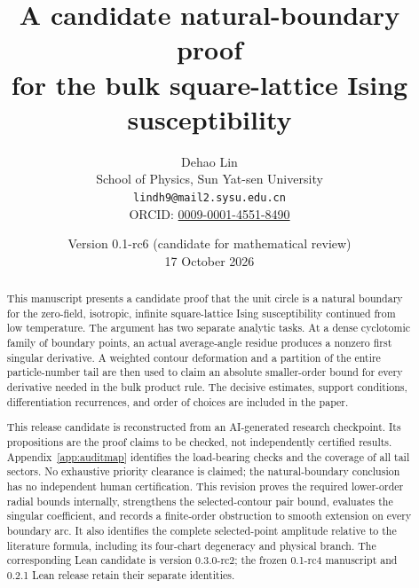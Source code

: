\documentclass[11pt]{article}
\title{A candidate natural-boundary proof\\
for the bulk square-lattice Ising susceptibility}
\author{Dehao Lin\\
\small School of Physics, Sun Yat-sen University\\
\small\texttt{lindh9@mail2.sysu.edu.cn}\\
\small ORCID: \href{https://orcid.org/0009-0001-4551-8490}{0009-0001-4551-8490}}
\date{Version 0.1-rc6 (candidate for mathematical review)\\17 October 2026}
\numberwithin{equation}{section}
\theoremstyle{definition}
\begin{document}
\maketitle

\begin{abstract}
This manuscript presents a candidate proof that the unit circle is a
natural boundary for the zero-field, isotropic, infinite square-lattice
Ising susceptibility continued from low temperature. The argument has
two separate analytic tasks. At a dense cyclotomic family of boundary
points, an actual average-angle residue produces a nonzero first
singular derivative. A weighted contour deformation and a partition of
the entire particle-number tail are then used to claim an absolute
smaller-order bound for every derivative needed in the bulk product
rule. The decisive estimates, support conditions, differentiation
recurrences, and order of choices are included in the paper.

This release candidate is reconstructed from an AI-generated research checkpoint.
Its propositions are the proof claims to be checked, not independently
certified results. Appendix~\ref{app:auditmap} identifies the load-bearing
checks and the coverage of all tail sectors. No exhaustive priority
clearance is claimed; the natural-boundary conclusion has no
independent human certification. This revision proves the required
lower-order radial bounds internally, strengthens the selected-contour
pair bound, evaluates the singular coefficient, and records a finite-order
obstruction to smooth extension on every boundary arc. It also identifies
the complete selected-point amplitude relative to the literature
formula, including its four-chart degeneracy and physical branch. The corresponding
Lean candidate is version 0.3.0-rc2; the frozen 0.1-rc4 manuscript and
0.2.1 Lean release retain their separate identities.
\end{abstract}
\end{document}

